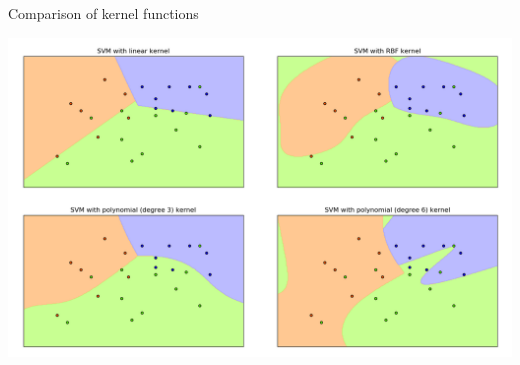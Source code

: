 \documentclass[compress]{beamer}
\begin{document}
\begin{frame}{Comparison of kernel functions}
    \begin{center}
        \includegraphics[width=\linewidth]{svm_comparison}
    \end{center}
\end{frame}
\end{document}
